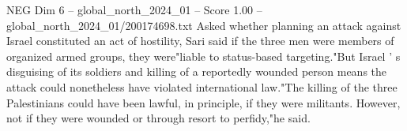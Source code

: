 \begin{textsample}{NEG Dim 6 – global\_north\_2024\_01 – Score 1.00 – global\_north\_2024\_01/200174698.txt}
Asked whether planning an attack against Israel constituted an act of hostility, Sari said if the three men were members of organized armed groups, they were"liable to status-based targeting."But Israel ' s disguising of its soldiers and killing of a reportedly wounded person means the attack could nonetheless have violated international law."The killing of the three Palestinians could have been lawful, in principle, if they were militants.
However, not if they were wounded or through resort to perfidy,"he said.

\end{textsample}

